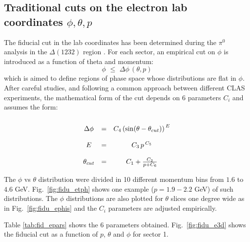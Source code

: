 \subsection{Traditional cuts on the electron lab coordinates $\phi, \theta, p$}
The fiducial cut in the lab coordinates has been determined during the $\pi^0$ analysis in
the $\Delta(1232)$ region \cite{bib:pi0_Delta}.
For each sector, an empirical cut on $\phi$ is introduced as a function of theta and momentum:
$$
\phi \,\,\le\,\, \Delta\phi \,(\theta, p)
$$
which is aimed to define regions of phase space whose distributions are flat in $\phi$.
After careful studies, and following a common approach between different CLAS experiments, the mathematical
form of the cut depends on 6 parameters  $C_i$
and assumes the form:\vspace{-0.3 cm}
$$
\begin{array}{c c c}
    \\
    \Delta\phi   & = & C_4 \left( \sin (\theta - \theta_{cut}) \right) ^{\,E} \\
    \\
    E        & = & C_3\, p\, ^{C_5} \\
    \\
    \theta_{cut} & = & C_1 + \frac{C_2}{p + C_6}
\end{array}
$$

The $\phi$ vs $\theta$ distribution were divided in 10 different momentum bins from $1.6$ to $4.6$ GeV.
Fig.~\ref{fig:fidu_etph} shows one example ($p=1.9-2.2$ GeV) of such distributions.
The $\phi$ distributions are also plotted for $\theta$ slices one degree wide as in Fig.~\ref{fig:fidu_ephis}
and the $C_i$ parameters are adjusted empirically.

Table \ref{tab:fid_epars} shows the 6 parameters obtained. Fig.~\ref{fig:fidu_e3d} shows
the fiducial cut as a function of $p$, $\theta$ and $\phi$ for sector 1.

